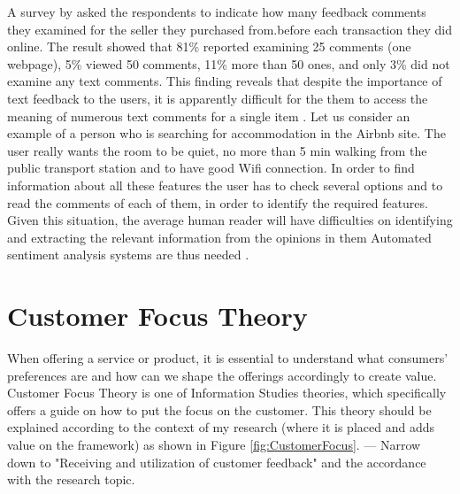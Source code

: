 A survey by \cite{pavlou2006institutional} asked the respondents to indicate how many feedback comments they examined for the seller they purchased from.before each transaction they did online. The result showed that 81\% reported examining 25 comments (one webpage), 5\% viewed 50 comments, 11\% more than 50 ones, and only 3\% did not examine any text comments. This finding reveals that despite the importance of text feedback to the users, it is apparently difficult for the them to access the meaning of numerous text comments for a single item \cite{pavlou2006institutional}.
Let us consider an example of a person who is searching for accommodation in the Airbnb site. The user really wants the room to be quiet, no more than 5 min walking from the public transport station and to have good Wifi connection. In order to find information about all these features the user has to check several options and to read the comments of each of them, in order to identify the required features. Given this situation, the average human reader will have difficulties on identifying and extracting the relevant information from the opinions in them Automated sentiment analysis systems are thus needed \cite{liu2012sentiment}.



\section{Customer Focus Theory}
\label{sec:CFTH}

When offering a service or product, it is essential to understand what consumers' preferences are and how can we shape the offerings accordingly to create value. Customer Focus Theory is one of Information Studies theories, which specifically offers a guide on how to put the focus on the customer. This theory should be explained according to the context of my research (where it is placed and adds value on the framework) as shown in Figure \ref{fig:CustomerFocus}. 
--- Narrow down to "Receiving and utilization of customer feedback" and the accordance with the research topic.

